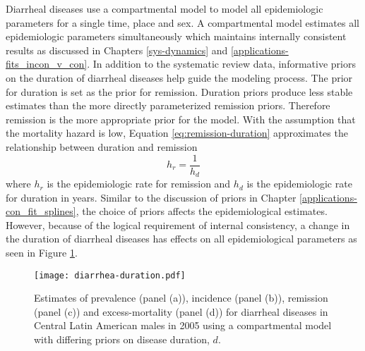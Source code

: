 Diarrheal diseases use a compartmental model to model all epidemiologic parameters for a single time, place and sex.  A compartmental model estimates all epidemiologic parameters simultaneously which maintains internally consistent results as discussed in Chapters \ref{sys-dynamics} and \ref{applications-fits_incon_v_con}.  In addition to the systematic review data, informative priors on the duration of diarrheal diseases help guide the modeling process.  The prior for duration is set as the prior for remission.  Duration priors produce less stable estimates than the more directly parameterized remission priors.  Therefore remission is the more appropriate prior for the model.  With the assumption that the mortality hazard is low, Equation \ref{eq:remission-duration} approximates the relationship between duration and remission
    \begin{equation} \label{eq:remission-duration}
    	h_{r} = \frac{1}{h_{d}}
    \end{equation}
where $h_{r}$ is the epidemiologic rate for remission and $h_{d}$ is the epidemiologic rate for duration in years.  Similar to the discussion of priors in Chapter \ref{applications-con_fit_splines}, the choice of priors affects the epidemiological estimates.  However, because of the logical requirement of internal consistency, a change in the duration of diarrheal diseases has effects on all epidemiological parameters as seen in Figure \ref{fig:app-diarrhea duration}.

    \begin{figure}[h]
        \begin{center}
            \texttt{[image: diarrhea-duration.pdf]}
            \caption{Estimates of prevalence (panel (a)), incidence (panel (b)), remission (panel (c)) and excess-mortality (panel (d)) for diarrheal diseases in Central Latin American males in 2005 using a compartmental model with differing priors on disease duration, $d$.}
            \label{fig:app-diarrhea duration}
        \end{center}
    \end{figure}
